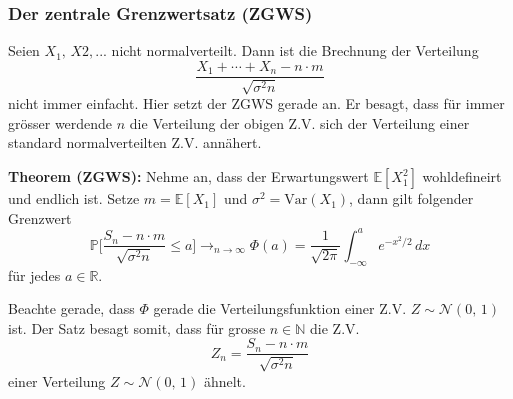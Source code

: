 \documentclass[a4paper]{extarticle}
\begin{document}
\subsubsection{Der zentrale Grenzwertsatz (ZGWS)}

Seien $X_1, \, X2,...$ nicht normalverteilt. Dann ist die Brechnung der Verteilung
\[
    \frac{X_1 + \cdots + X_n - n \cdot m}{\sqrt{\sigma^2n}}
\]
nicht immer einfacht. Hier setzt der ZGWS gerade an. Er besagt, dass für immer grösser werdende $n$ die Verteilung der obigen Z.V. sich der Verteilung einer standard normalverteilten Z.V. annähert.

\begin{tbox}
    \textbf{Theorem (ZGWS):} Nehme an, dass der Erwartungswert $\mathbb{E}[X_1^2]$ wohldefineirt und endlich ist. Setze $m = \mathbb{E}[X_1]$ und $\sigma^2 = \text{Var}(X_1)$, dann gilt folgender Grenzwert
    \[
        \mathbb{P}\Big[\frac{S_n - n \cdot m}{\sqrt{\sigma^2n}} \leq a\Big] \to_{n \to \infty} \Phi(a) = \frac{1}{\sqrt{2 \pi}} \int_{- \infty}^a e^{-x^2 / 2} \, dx
    \]
    für jedes $a \in \mathbb{R}$.
\end{tbox}

Beachte gerade, dass $\Phi$ gerade die Verteilungsfunktion einer Z.V. $Z \sim \mathcal{N}(0, \, 1)$ ist. Der Satz besagt somit, dass für grosse $n \in \mathbb{N}$ die Z.V.
\[
    Z_n = \frac{S_n - n \cdot m}{\sqrt{\sigma^2n}}
\]
einer Verteilung $Z \sim \mathcal{N}(0, \, 1)$ ähnelt.
\end{document}
